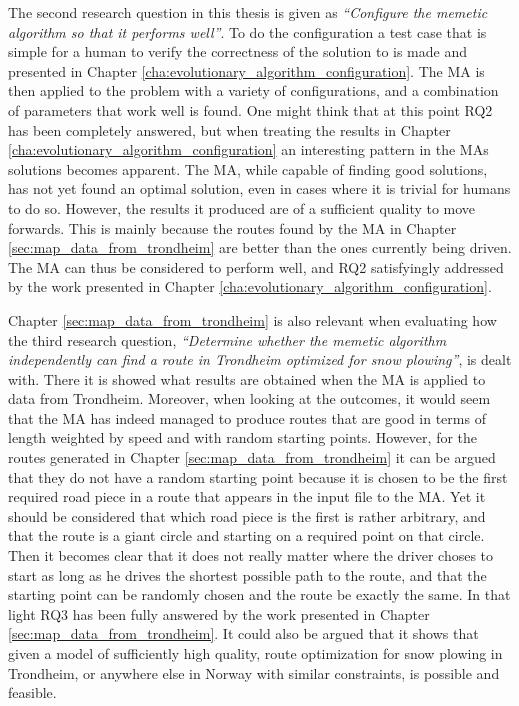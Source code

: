 The second research question in this thesis is given as \emph{\enquote{Configure the memetic algorithm so that it performs well}}. To do the configuration a test case that is simple for a human to verify the correctness of the solution to is made and presented in Chapter \ref{cha:evolutionary_algorithm_configuration}. The MA is then applied to the problem with a variety of configurations, and a combination of parameters that work well is found. One might think that at this point RQ2 has been completely answered, but when treating the results in Chapter \ref{cha:evolutionary_algorithm_configuration} an interesting pattern in the MAs solutions becomes apparent. The MA, while capable of finding good solutions, has not yet found an optimal solution, even in cases where it is trivial for humans to do so. However, the results it produced are of a sufficient quality to move forwards. This is mainly because the routes found by the MA in Chapter \ref{sec:map_data_from_trondheim} are better than the ones currently being driven. The MA can thus be considered to perform well, and RQ2 satisfyingly addressed by the work presented in Chapter \ref{cha:evolutionary_algorithm_configuration}.

Chapter \ref{sec:map_data_from_trondheim} is also relevant when evaluating how the third research question, \emph{\enquote{Determine whether the memetic algorithm independently can find a route in Trondheim optimized for snow plowing}}, is dealt with. There it is showed what results are obtained when the MA is applied to data from Trondheim. Moreover, when looking at the outcomes, it would seem that the MA has indeed managed to produce routes that are good in terms of length weighted by speed and with random starting points. However, for the routes generated in Chapter \ref{sec:map_data_from_trondheim} it can be argued that they do not have a random starting point because it is chosen to be the first required road piece in a route that appears in the input file to the MA. Yet it should be considered that which road piece is the first is rather arbitrary, and that the route is a giant circle and starting on a required point on that circle. Then it becomes clear that it does not really matter where the driver choses to start as long as he drives the shortest possible path to the route, and that the starting point can be randomly chosen and the route be exactly the same. In that light RQ3 has been fully answered by the work presented in Chapter \ref{sec:map_data_from_trondheim}. It could also be argued that it shows that given a model of sufficiently high quality, route optimization for snow plowing in Trondheim, or anywhere else in Norway with similar constraints, is possible and feasible.

